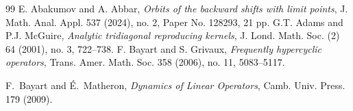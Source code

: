 \documentclass[12pt, reqno]{amsart}
\theoremstyle{definition}
\theoremstyle{remark}
\numberwithin{equation}{section}
\begin{document}

\begin{thebibliography}{99}
 E. Abakumov and A. Abbar, \textit{Orbits of the backward shifts with limit points}, J. Math. Anal. Appl. 537 (2024), no. 2, Paper No. 128293, 21 pp.
 G.T. Adams and P.J. McGuire, \textit{Analytic tridiagonal reproducing kernels}, J. Lond. Math. Soc. (2) 64 (2001), no. 3, 722–738.
 F. Bayart and S. Grivaux, \textit{Frequently hypercyclic operators}, Trans. Amer. Math. Soc. 358 (2006), no. 11, 5083–5117.

F.\ Bayart and \'{E}.\ Matheron, \textit{Dynamics of Linear Operators},
Camb. Univ. Press. 179 (2009).





\end{thebibliography}
\end{document}
